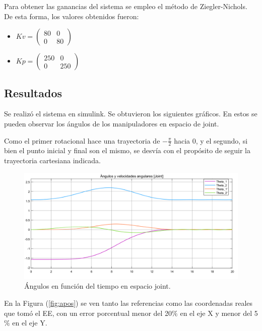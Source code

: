 
\label{sec:posic}
Para obtener las ganancias del sistema se empleo el método de Ziegler-Nichols. De esta forma, los valores obtenidos fueron:
\begin{multicols}{2}
\begin{itemize}
	\item $Kv = \begin{pmatrix}
	80 & 0 \\
	0 & 80
	\end{pmatrix}$
	\item $Kp = \begin{pmatrix}
	250 & 0 \\
	0 & 250
	\end{pmatrix}$
\end{itemize}
\end{multicols}

\subsection{Resultados}
Se realizó el sistema en simulink. Se obtuvieron los siguientes gráficos.
En estos se pueden observar los ángulos de los manipuladores en espacio de joint.

Como el primer rotacional hace una trayectoria de $-\frac{\pi}{2}$ hacia $0$, y el segundo, si bien el punto inicial y final son el mismo, se desvía con el propósito de seguir la trayectoria cartesiana indicada.

\begin{figure}[H]
	\centering
	\includegraphics[width=0.8\linewidth]{ImagenesControl de posición no lineal/1_3_a}
	\caption{Ángulos en función del tiempo en espacio joint.}	
	\label{fig:athetas}
\end{figure}


En la Figura (\ref{fig:apos}) se ven tanto las referencias como las coordenadas reales que tomó el EE, con un error porcentual menor del 20$\%$ en el eje X y menor del 5$\%$ en el eje Y. 

